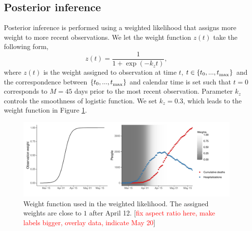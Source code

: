 \documentclass[11pt]{article}
\newcommand{\comments}[1]{[\textcolor{red}{#1}]}
\begin{document}
\subsection{Posterior inference} 

Posterior inference is performed using a weighted likelihood that assigns more weight to more recent observations. We let the weight function $z(t)$ take the following form, 
\begin{equation}
z(t) = \frac{1}{1 + \exp(- k_z t)}, 
\label{eq:datweight}
\end{equation}
where $z(t)$ is the weight assigned to observation at time $t$, $t \in \{t_0, ..., t_\textsubscript{max} \}$ and the correspondence between $\{t_0, ..., t_\textsubscript{max} \}$ and calendar time is set such that $t=0$ corresponds to $M = 45$ days prior to the most recent observation. Parameter $k_z$ controls the smoothness of logistic function. We set $k_z = 0.3$, which leads to the weight function in Figure \ref{fig:datweights}. 


\begin{figure} %
	\centering
	\includegraphics[width=.6\textwidth]{figures/data_weights.pdf}
	\caption{Weight function used in the weighted likelihood. The assigned weights are close to $1$ after April 12. \comments{fix aspect ratio here, make labels bigger, overlay data, indicate May 20}}
	\label{fig:datweights}
\end{figure}
\end{document}

